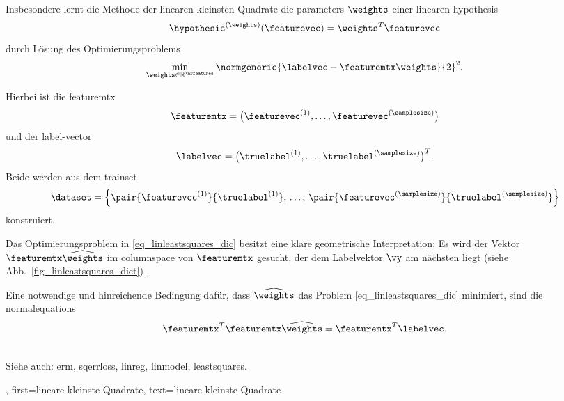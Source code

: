 {{{{{{Insbesondere lernt die Methode der linearen kleinsten Quadrate die \glspl{parameter} $\weights$ 
einer linearen \gls{hypothesis} 
\[
  \hypothesis^{(\weights)}(\featurevec) = \weights^{T} \featurevec
\]
durch Lösung des Optimierungsproblems
\begin{equation} 
 	\label{eq_linleastsquares_dic}
 	\min_{\weights \in \mathbb{R}^{\nrfeatures}} \normgeneric{\labelvec - \featuremtx \weights}{2}^2.
\end{equation} 

Hierbei ist die \gls{featuremtx}
\[
  \featuremtx = \big(\featurevec^{(1)},\ldots,\featurevec^{(\samplesize)}\big)
\]
und der \gls{label}-\gls{vector}
\[
  \labelvec = \big(\truelabel^{(1)},\ldots,\truelabel^{(\samplesize)}\big)^{T}.
\]
Beide werden aus dem \gls{trainset}
\[
  \dataset = \left\{ \pair{\featurevec^{(1)}}{\truelabel^{(1)}}, \,\ldots, \,
 			   \pair{\featurevec^{(\samplesize)}}{\truelabel^{(\samplesize)}} \right\}
\]
konstruiert. 

Das Optimierungsproblem in \eqref{eq_linleastsquares_dic} besitzt eine klare geometrische Interpretation: 
Es wird der Vektor $\featuremtx \widehat{\weights}$ im \gls{columnspace} von $\featuremtx$ gesucht, 
der dem Labelvektor $\vy$ am nächsten liegt (siehe Abb.~\ref{fig_linleastsquares_dict}) 
\cite[Kap.~8]{BoydConvexBook}. 

Eine notwendige und hinreichende Bedingung dafür, dass $\widehat{\weights}$ das 
Problem \eqref{eq_linleastsquares_dic} minimiert, sind die \gls{normalequations}
\[
  \featuremtx^{T} \featuremtx \widehat{\weights} = \featuremtx^{T} \labelvec.
\]

\\
Siehe auch: \gls{erm}, \gls{sqerrloss}, \gls{linreg}, \gls{linmodel}, \gls{leastsquares}.},
 first={lineare kleinste Quadrate},
 text={lineare kleinste Quadrate}
}

}}}}
